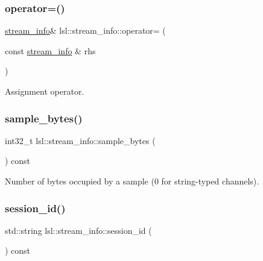 \subsubsection{\texorpdfstring{operator=()}{operator=()}}
{\footnotesize\ttfamily \hyperlink{classlsl_1_1stream__info}{stream\+\_\+info}\& lsl\+::stream\+\_\+info\+::operator= (\begin{DoxyParamCaption}\item[{const \hyperlink{classlsl_1_1stream__info}{stream\+\_\+info} \&}]{rhs }\end{DoxyParamCaption})\hspace{0.3cm}{\ttfamily [inline]}}



Assignment operator. 

\mbox{\label{classlsl_1_1stream__info_ab68def3a9c81c289ba46a5b40c6b4084}} 
\subsubsection{\texorpdfstring{sample\+\_\+bytes()}{sample\_bytes()}}
{\footnotesize\ttfamily int32\+\_\+t lsl\+::stream\+\_\+info\+::sample\+\_\+bytes (\begin{DoxyParamCaption}{ }\end{DoxyParamCaption}) const\hspace{0.3cm}{\ttfamily [inline]}}



Number of bytes occupied by a sample (0 for string-\/typed channels). 

\mbox{\label{classlsl_1_1stream__info_a59036c0e83bcb07b711ec7e3e3b15fef}} 
\subsubsection{\texorpdfstring{session\+\_\+id()}{session\_id()}}
{\footnotesize\ttfamily std\+::string lsl\+::stream\+\_\+info\+::session\+\_\+id (\begin{DoxyParamCaption}{ }\end{DoxyParamCaption}) const\hspace{0.3cm}{\ttfamily [inline]}}

